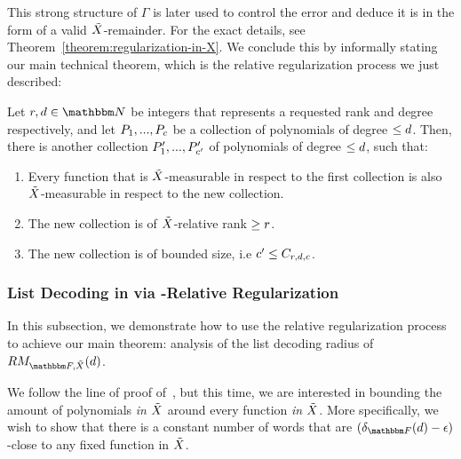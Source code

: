 This strong structure of $\Gamma$ is later used to control the error and deduce it is in the form of a valid ${\tilde{X}}$-remainder.
For the exact details, see Theorem~\ref{theorem:regularization-in-X}.
We conclude this by informally stating our main technical theorem, which is the relative regularization process we just described:
\begin{theorem}
Let $\rankval, \degree \in \naturalnumbersset$ be integers that represents a requested rank and degree respectively,
and let $\genpoly_1,...,\genpoly_c$ be a collection of polynomials of degree $\leq d$.
Then, there is another collection $\genpoly^{\prime}_1,...,\genpoly^{\prime}_{c^\prime}$ of polynomials of degree $\leq d$,
such that:
\begin{enumerate}
    \item Every function that is ${\tilde{X}}$-measurable in respect to the first collection is also ${\tilde{X}}$-measurable in respect to the new collection.
    \item The new collection is of ${\tilde{X}}$-relative rank $\geq {{r}}$.
    \item The new collection is of bounded size, i.e $c^\prime \leq C_{{{{r}}}, d, c}$.
\end{enumerate}
\end{theorem}

\subsubsection{List Decoding in \titlevariety via \titlevariety-Relative Regularization}
In this subsection, we demonstrate how to use the relative regularization process to achieve our main theorem: analysis of the list decoding radius of $\reedmullercodeex{\basefield}{\variety}{\degree}$.

We follow the line of proof of~\cite{bhowmick2014list}, but this time, we are interested in bounding the amount of polynomials \emph{in ${\tilde{X}}$} around every function \emph{in ${\tilde{X}}$}.
More specifically, we wish to show that there is a constant number of words that are $(\normalizedcodedistance{\basefield}{\degree} - \epsilon)$-close to any fixed function in ${\tilde{X}}$.


